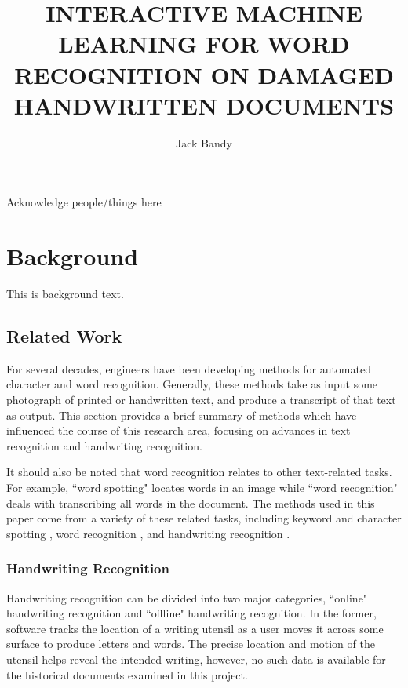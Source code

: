 \documentclass[final]{ukthesis}
\begin{document}
\author{Jack Bandy}
\title{INTERACTIVE MACHINE LEARNING FOR WORD RECOGNITION ON DAMAGED HANDWRITTEN DOCUMENTS}
\frontmatter
\maketitle
\begin{acknowledgments}
Acknowledge people/things here
\end{acknowledgments}
\tableofcontents\clearpage
\listoffigures\clearpage
\listoftables\clearpage
\mainmatter
\chapter{Background}
This is background text.

\section{Related Work}
For several decades, engineers have been developing methods for automated character and word recognition. Generally, these methods take as input some photograph of printed or handwritten text, and produce a transcript of that text as output. This section provides a brief summary of methods which have influenced the course of this research area, focusing on advances in text recognition and handwriting recognition.

It should also be noted that word recognition relates to other text-related tasks. For example, ``word spotting" locates words in an image while ``word recognition" deals with transcribing all words in the document. The methods used in this paper come from a variety of these related tasks, including keyword and character spotting \cite{sharma2015adapting,frinken2012novel}, word recognition \cite{howe2009finding}, and handwriting recognition \cite{fischer2013fast,bluche2013feature}.


\subsection{Handwriting Recognition}
Handwriting recognition can be divided into two major categories, ``online" handwriting recognition and ``offline" handwriting recognition. In the former, software tracks the location of a writing utensil as a user moves it across some surface to produce letters and words. The precise location and motion of the utensil helps reveal the intended writing, however, no such data is available for the historical documents examined in this project.
\end{document}
